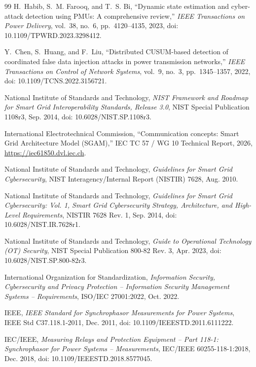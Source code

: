 \documentclass[12pt,a4paper]{report}
\begin{document}
\begin{thebibliography}{99}
H.~Habib, S.~M. Farooq, and T.~S. Bi,
``Dynamic state estimation and cyber-attack detection using PMUs: A comprehensive review,''
\textit{IEEE Transactions on Power Delivery},
vol.~38, no.~6, pp.~4120--4135, 2023, doi: 10.1109/TPWRD.2023.3298412.

Y.~Chen, S.~Huang, and F.~Liu,
``Distributed CUSUM-based detection of coordinated false data injection attacks in power transmission networks,''
\textit{IEEE Transactions on Control of Network Systems},
vol.~9, no.~3, pp.~1345--1357, 2022, doi: 10.1109/TCNS.2022.3156721.

National Institute of Standards and Technology,
\textit{NIST Framework and Roadmap for Smart Grid Interoperability Standards, Release 3.0},
NIST Special Publication 1108r3, Sep. 2014, doi: 10.6028/NIST.SP.1108r3.

International Electrotechnical Commission,
``Communication concepts: Smart Grid Architecture Model (SGAM),''
IEC TC 57 / WG 10 Technical Report, 2026, \url{https://iec61850.dvl.iec.ch}.

National Institute of Standards and Technology,
\textit{Guidelines for Smart Grid Cybersecurity},
NIST Interagency/Internal Report (NISTIR) 7628, Aug. 2010.

National Institute of Standards and Technology,
\textit{Guidelines for Smart Grid Cybersecurity: Vol. 1, Smart Grid Cybersecurity Strategy, Architecture, and High-Level Requirements},
NISTIR 7628 Rev. 1, Sep. 2014, doi: 10.6028/NIST.IR.7628r1.

National Institute of Standards and Technology,
\textit{Guide to Operational Technology (OT) Security},
NIST Special Publication 800-82 Rev. 3, Apr. 2023, doi: 10.6028/NIST.SP.800-82r3.

International Organization for Standardization,
\textit{Information Security, Cybersecurity and Privacy Protection -- Information Security Management Systems -- Requirements},
ISO/IEC 27001:2022, Oct. 2022.

IEEE,
\textit{IEEE Standard for Synchrophasor Measurements for Power Systems},
IEEE Std C37.118.1-2011, Dec. 2011, doi: 10.1109/IEEESTD.2011.6111222.

IEC/IEEE,
\textit{Measuring Relays and Protection Equipment -- Part 118-1: Synchrophasor for Power Systems -- Measurements},
IEC/IEEE 60255-118-1:2018, Dec. 2018, doi: 10.1109/IEEESTD.2018.8577045.


\end{thebibliography}
\end{document}

